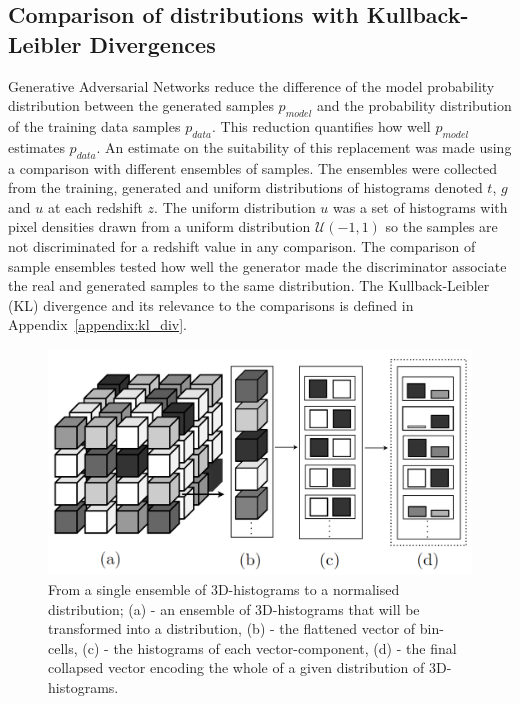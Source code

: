 \documentclass[twocolumn]{article}
\numberwithin{equation}{section}
\begin{document}
\subsection{Comparison of distributions with Kullback-Leibler Divergences}
Generative Adversarial Networks reduce the difference of the model probability distribution between the generated samples 
$p_{model}$ and the probability distribution of the training data samples $p_{data}$. This reduction quantifies how well 
$p_{model}$ estimates $p_{data}$. An estimate on the suitability of this replacement was made using a comparison with 
different ensembles of samples. The ensembles were collected from the training, generated and uniform distributions of 
histograms denoted $t$, $g$ and $u$ at each redshift $z$. The uniform distribution $u$ was a set of histograms with pixel 
densities drawn from a uniform distribution $\mathcal{U}(-1,1)$ so the samples are not discriminated for a redshift value 
in any comparison. The comparison of sample ensembles tested how well the generator made the discriminator associate the 
real and generated samples to the same distribution. The Kullback-Leibler (KL) divergence and its relevance to the 
comparisons is defined in Appendix~\ref{appendix:kl_div}.


\begin{figure}
\includegraphics[width=\columnwidth, trim=4 4 4 4,clip]{figures/diagrams/kl_stat_process1.png}
\centering
\caption{From a single ensemble of 3D-histograms to a normalised distribution; 
         (a) - an ensemble of 3D-histograms that will be transformed into a distribution, 
         (b) - the flattened vector of bin-cells, 
         (c) - the histograms of each vector-component, 
         (d) - the final collapsed vector encoding the whole of a given distribution of 3D-histograms.}
\label{fig:klstat}
\end{figure}
\end{document}
